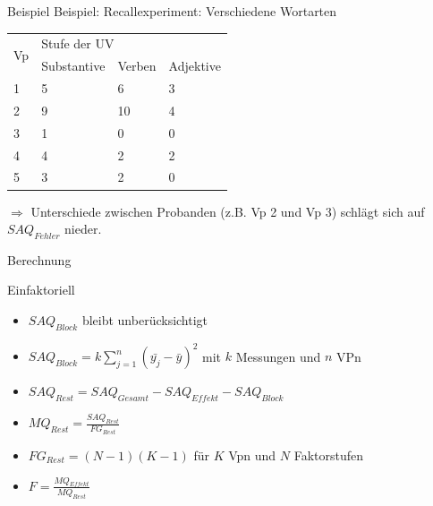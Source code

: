 \documentclass{beamer}
\begin{document}
	\begin{frame}{Beispiel}
		Beispiel: Recallexperiment: Verschiedene Wortarten
		\begin{table}[]
			\centering
			\begin{tabular}{|l|l|l|l|}
				\hline
				\multirow{2}{*}{Vp} & \multicolumn{3}{l|}{Stufe der UV} \\
				& Substantive  & Verben & Adjektive \\ \hline
				1                   & 5            & 6      & 3         \\ \hline
				2                   & 9            & 10     & 4         \\ \hline
				3                   & 1            & 0      & 0         \\ \hline
				4                   & 4            & 2      & 2         \\ \hline
				5                   & 3            & 2      & 0         \\ \hline
			\end{tabular}
		\end{table}
		$\Rightarrow$ Unterschiede zwischen Probanden (z.B. Vp 2 und Vp 3) schlägt sich auf $SAQ_{Fehler}$ nieder.
	\end{frame}
	
	\begin{frame}{Berechnung}
		\begin{block}{Einfaktoriell}
			\begin{itemize}\itemsep=1ex
				\item $SAQ_{Block}$ bleibt unberücksichtigt
				\item $SAQ_{Block} = k \sum_{j=1}^{n}(\bar{y_j}- \bar{y})^2$ mit $k$ Messungen und $n$ VPn
				\item $SAQ_{Rest} = SAQ_{Gesamt} - SAQ_{Effekt} - SAQ_{Block}$
				\item $MQ_{Rest} = \frac{SAQ_{Rest}}{FG_{Rest}}$
				\item $FG_{Rest} = (N-1)(K-1)$ für $K$ Vpn und $N$ Faktorstufen
				\item $F = \frac{MQ_{Effekt}}{MQ_{Rest}}$
			\end{itemize}
		\end{block}
	\end{frame}
	
\end{document}
